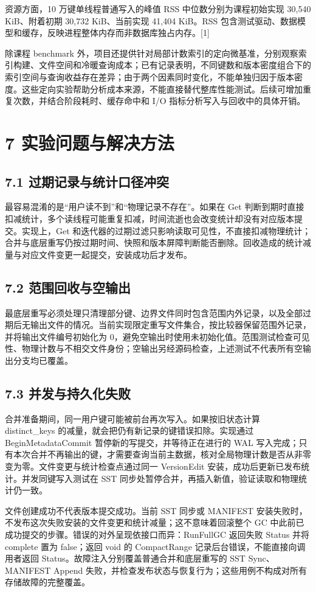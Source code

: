 \documentclass[UTF8,a4paper,10pt,twocolumn,fontset=fandol]{ctexart}
\begin{document}
资源方面，10 万键单线程普通写入的峰值 RSS 中位数分别为课程初始实现 30,540 KiB、附着初期 30,732 KiB、当前实现 41,404 KiB。RSS 包含测试驱动、数据模型和缓存，反映进程整体内存而非数据库独占内存。[1]

除课程 benchmark 外，项目还提供针对局部计数索引的定向微基准，分别观察索引构建、文件空间和冷暖查询成本；已有记录表明，不同键数和版本密度组合下的索引空间与查询收益存在差异；由于两个因素同时变化，不能单独归因于版本密度。这些定向实验帮助分析成本来源，不能直接替代整库性能测试。后续可增加重复次数，并结合阶段耗时、缓存命中和 I/O 指标分析写入与回收中的具体开销。

\section*{7 实验问题与解决方法}
\subsection*{7.1 过期记录与统计口径冲突}
最容易混淆的是“用户读不到”和“物理记录不存在”。如果在 Get 判断到期时直接扣减统计，多个读线程可能重复扣减，时间流逝也会改变统计却没有对应版本提交。实现上，Get 和迭代器的过期过滤只影响读取可见性，不直接扣减物理统计；合并与底层重写仍按过期时间、快照和版本屏障判断能否删除。回收造成的统计减量与对应文件变更一起提交，安装成功后才发布。

\subsection*{7.2 范围回收与空输出}
最底层重写必须处理只清理部分键、边界文件同时包含范围内外记录，以及全部过期后无输出文件的情况。当前实现限定重写文件集合，按比较器保留范围外记录，并将输出文件编号初始化为 0，避免空输出时使用未初始化值。范围测试检查可见性、物理计数与不相交文件身份；空输出另经源码检查，上述测试不代表所有空输出分支均已覆盖。

\subsection*{7.3 并发与持久化失败}
合并准备期间，同一用户键可能被前台再次写入。如果按旧状态计算 distinct\_keys 的减量，就会把仍有新记录的键错误扣除。实现通过 BeginMetadataCommit 暂停新的写提交，并等待正在进行的 WAL 写入完成；只有本次合并不再输出的键，才需要查询当前主数据，核对全局物理计数是否从非零变为零。文件变更与统计检查点通过同一 VersionEdit 安装，成功后更新已发布统计。并发同键写入测试在 SST 同步处暂停合并，再插入新值，验证读取和物理统计仍一致。

文件创建成功不代表版本提交成功。当前 SST 同步或 MANIFEST 安装失败时，不发布这次失败安装的文件变更和统计减量；这不意味着回滚整个 GC 中此前已成功提交的步骤。错误的对外呈现依接口而异：RunFullGC 返回失败 Status 并将 complete 置为 false；返回 void 的 CompactRange 记录后台错误，不能直接向调用者返回 Status。故障注入分别覆盖普通合并和底层重写的 SST Sync、MANIFEST Append 失败，并检查发布状态与恢复行为；这些用例不构成对所有存储故障的完整覆盖。
\end{document}
